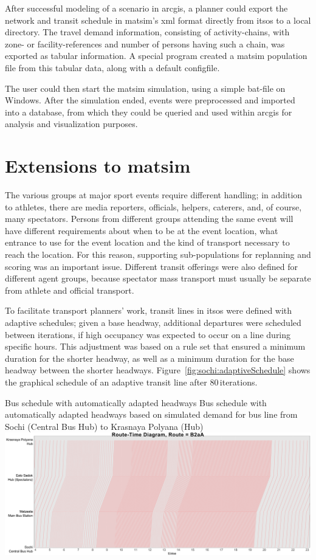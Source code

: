 After successful modeling of a scenario in \gls{arcgis}, a planner could export
the network and transit schedule in \gls{matsim}'s \gls{xml} format directly from \gls{itsos} to a
local directory. The travel demand information, consisting of activity-chains,
with zone- or facility-references and number of persons having such a
chain, was exported as tabular information. A special program created a \gls{matsim}
population file from this tabular data, along with a default \gls{configfile}.

The user could then start the \gls{matsim} simulation, using a simple bat-file
on Windows. After the simulation ended,  events were preprocessed and
imported into a database, from which they could be queried and used within \gls{arcgis}
for analysis and visualization purposes.

\section{Extensions to \protect\gls{matsim}}
The various groups at major sport events require different handling;
in addition to athletes, there are media reporters, officials,
helpers, caterers, and, of course, many spectators. Persons from different
groups attending the same event will have different requirements about when
to be at the event location, what entrance to use for the event
location and the kind of transport necessary to reach the location. For this reason,
supporting sub-populations for \gls{replanning} and scoring was an important issue.
Different transit offerings were also defined for different agent groups,
because spectator mass transport must usually be separate from
athlete and official transport.

To facilitate transport planners' work, transit lines in
\gls{itsos} were defined with adaptive schedules; given a base headway,
additional departures were scheduled between iterations, if high
occupancy was expected to occur on a line during specific hours. This adjustment was based
on a rule set that ensured a minimum duration for the shorter headway, as well
as a minimum duration for the base headway between the shorter headways.
Figure~\ref{fig:sochi:adaptiveSchedule} shows the graphical schedule of an
adaptive transit line after 80\,iterations.

\createfigure%
{Bus schedule with automatically adapted headways}%
{Bus schedule with automatically adapted headways based on simulated demand for
bus line from Sochi (Central Bus Hub) to Krasnaya Polyana (Hub)}%
{\label{fig:sochi:adaptiveSchedule}}%
{\includegraphics[width=1.\textwidth,angle=0]{./using/figures/sochi_adaptiveSchedule.pdf}}%
{}

